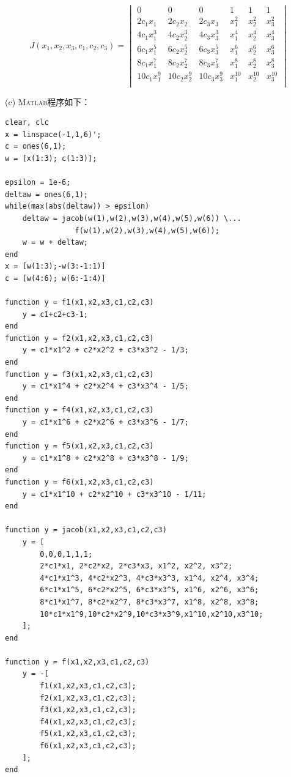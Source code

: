 \documentclass[12pt,a4paper,utf8]{ctexart}
\begin{document}
\begin{enumerate}
\begin{equation}
    J(x_1,x_2,x_3,c_1,c_2,c_3)=
    \begin{vmatrix}
        0 & 0 & 0 & 1 & 1 & 1\\
        2c_1 x_1 & 2c_2 x_2 & 2c_3 x_3 & x_1^2 & x_2^2 & x_3^2\\
        4c_1 x_1^3 & 4c_2 x_2^3 & 4c_3 x_3^3 & x_1^4 & x_2^4 & x_3^4\\
        6c_1 x_1^5 & 6c_2 x_2^5 & 6c_3 x_3^5 & x_1^6 & x_2^6 & x_3^6\\
        8c_1 x_1^7 & 8c_2 x_2^7 & 8c_3 x_3^7 & x_1^8 & x_2^8 & x_3^8\\
        10c_1 x_1^9 & 10c_2 x_2^9 & 10c_3 x_3^9 & x_1^{10} & x_2^{10} & x_3^{10}\\
    \end{vmatrix}
\end{equation}

\subitem(c)
\textsc{Matlab}程序如下：
\begin{lstlisting}[frame=single]
clear, clc
x = linspace(-1,1,6)';
c = ones(6,1);
w = [x(1:3); c(1:3)];

epsilon = 1e-6;
deltaw = ones(6,1);
while(max(abs(deltaw)) > epsilon)
    deltaw = jacob(w(1),w(2),w(3),w(4),w(5),w(6)) \...
                f(w(1),w(2),w(3),w(4),w(5),w(6));
    w = w + deltaw;
end
x = [w(1:3);-w(3:-1:1)]
c = [w(4:6); w(6:-1:4)]

function y = f1(x1,x2,x3,c1,c2,c3)
    y = c1+c2+c3-1;
end
function y = f2(x1,x2,x3,c1,c2,c3)
    y = c1*x1^2 + c2*x2^2 + c3*x3^2 - 1/3;
end
function y = f3(x1,x2,x3,c1,c2,c3)
    y = c1*x1^4 + c2*x2^4 + c3*x3^4 - 1/5;
end
function y = f4(x1,x2,x3,c1,c2,c3)
    y = c1*x1^6 + c2*x2^6 + c3*x3^6 - 1/7;
end
function y = f5(x1,x2,x3,c1,c2,c3)
    y = c1*x1^8 + c2*x2^8 + c3*x3^8 - 1/9;
end
function y = f6(x1,x2,x3,c1,c2,c3)
    y = c1*x1^10 + c2*x2^10 + c3*x3^10 - 1/11;
end

function y = jacob(x1,x2,x3,c1,c2,c3)
    y = [
        0,0,0,1,1,1;
        2*c1*x1, 2*c2*x2, 2*c3*x3, x1^2, x2^2, x3^2;
        4*c1*x1^3, 4*c2*x2^3, 4*c3*x3^3, x1^4, x2^4, x3^4;
        6*c1*x1^5, 6*c2*x2^5, 6*c3*x3^5, x1^6, x2^6, x3^6;
        8*c1*x1^7, 8*c2*x2^7, 8*c3*x3^7, x1^8, x2^8, x3^8;
        10*c1*x1^9,10*c2*x2^9,10*c3*x3^9,x1^10,x2^10,x3^10;
    ];
end

function y = f(x1,x2,x3,c1,c2,c3)
    y = -[
        f1(x1,x2,x3,c1,c2,c3);
        f2(x1,x2,x3,c1,c2,c3);
        f3(x1,x2,x3,c1,c2,c3);
        f4(x1,x2,x3,c1,c2,c3);
        f5(x1,x2,x3,c1,c2,c3);
        f6(x1,x2,x3,c1,c2,c3);
    ];
end
\end{lstlisting}


\end{enumerate}
\end{document}
